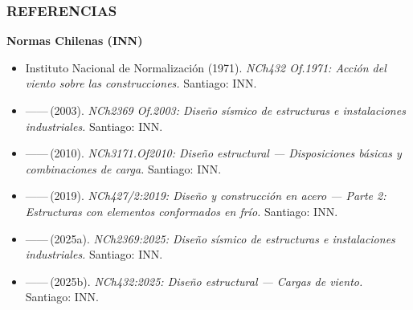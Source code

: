\documentclass[11.5pt,aspectratio=169,handout]{beamer}
\newcommand{\ctitle}[1]{\frametitle{#1}}
\begin{document}
\begin{frame}
\ctitle{REFERENCIAS}
\vspace{-1mm}
\scriptsize\textbf{Normas Chilenas (INN)}\\[1mm]
\begin{itemize}\scriptsize\setlength{\itemsep}{0.5mm}
  \item Instituto Nacional de Normalización (1971). \textit{NCh432 Of.1971:
        Acción del viento sobre las construcciones.} Santiago: INN.
  \item ——\,(2003). \textit{NCh2369 Of.2003: Diseño sísmico de estructuras
        e instalaciones industriales.} Santiago: INN.
  \item ——\,(2010). \textit{NCh3171.Of2010: Diseño estructural —
        Disposiciones básicas y combinaciones de carga.} Santiago: INN.
  \item ——\,(2019). \textit{NCh427/2:2019: Diseño y construcción en acero
        — Parte 2: Estructuras con elementos conformados en frío.}
        Santiago: INN.
  \item ——\,(2025a). \textit{NCh2369:2025: Diseño sísmico de estructuras
        e instalaciones industriales.} Santiago: INN.
  \item ——\,(2025b). \textit{NCh432:2025: Diseño estructural — Cargas de
        viento.} Santiago: INN.
\end{itemize}
\end{frame}
\end{document}
